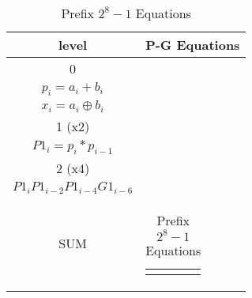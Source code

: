 \begin{table}[H]
\centering
     \begin{tabularx}{\textwidth}{ || c | X || } 

        \hline
        level & P-G Equations\\
        \hline
        \hline
 
        0   & 
        \begin{tabular}{@{}c@{}}
        $g_i = a_i * b_i$\\
        $p_i = a_i + b_i$\\
        $x_i = a_i \oplus b_i $
        \end{tabular}\\\hline

        1 (x2)  & 
        \begin{tabular}{@{}c@{}}
        $G1_i = g_i + p_ig_{i-1}$\\
        $P1_i = p_i * p_{i-1}$
        \end{tabular}\\\hline

        2 (x4)  & 
        \begin{tabular}{@{}c@{}}
        $G2_i = G1_i + P1_{i}G1_{i-2} + P1_{i}P1_{i-2}G1_{i-4} +$ \\ $P1_{i}P1_{i-2}P1_{i-4}G1_{i-6}$
        \end{tabular}\\\hline

        SUM   & 
        \begin{tabular}{@{}c@{}}
        $ sum_i = G_{i-1} \oplus x_i$
        \end{tabular}\\\hline

    \end{tabularx}
\caption{Prefix $2^{8}-1$ Equations}
\end{table}



